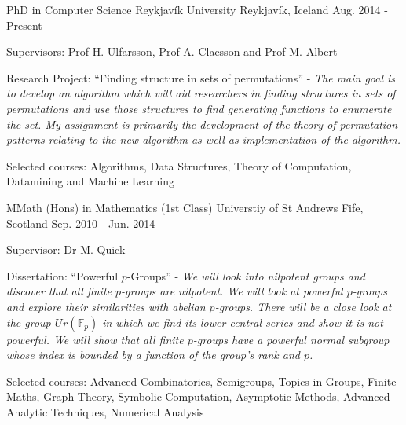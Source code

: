 


\begin{cventries}


  \cventry
  {PhD in Computer Science} %
  {Reykjavík University} %
  {Reykjavík, Iceland} %
  {Aug. 2014 - Present} %
  {
    \begin{cvitems} %
      \item {
      Supervisors: Prof H. Ulfarsson, Prof A. Claesson and Prof M. Albert
      }
      \item {
      Research Project: ``Finding structure in sets of permutations'' -
      \textit{The main goal is to develop an algorithm which will aid
      researchers in finding structures in sets of permutations and use those
      structures to find generating functions to enumerate the set. My
      assignment is primarily the development of the theory of permutation
      patterns relating to the new algorithm as well as implementation of the
      algorithm.}
      }
      \item {
      Selected courses: Algorithms, Data Structures, Theory of Computation,
      Datamining and Machine Learning
      }
    \end{cvitems}
  }


  \cventry
    {MMath (Hons) in Mathematics (1st Class)} %
    {Universtiy of St Andrews} %
    {Fife, Scotland} %
    {Sep. 2010 - Jun. 2014} %
    {
      \begin{cvitems} %
        \item {
        Supervisor: Dr M. Quick
        }
        \item {
        Dissertation: ``Powerful $p$-Groups'' - \textit{We will look into
        nilpotent groups and discover that all finite $p$-groups are nilpotent.
        We will look at powerful $p$-groups and explore their similarities with
        abelian $p$-groups. There will be a close look at the group
        $U_­­r(\mathbb{F}_p)$ in which we find its lower central series and show
        it is not powerful. We will show that all finite $p$-groups have a
        powerful normal subgroup whose index is bounded by a function of the
        group's rank and $p$.}
        }
        \item {
        Selected courses: Advanced Combinatorics, Semigroups, Topics in Groups,
        Finite Maths, Graph Theory, Symbolic Computation, Asymptotic Methods,
        Advanced Analytic Techniques, Numerical Analysis
        }
      \end{cvitems}
    }

\end{cventries}
